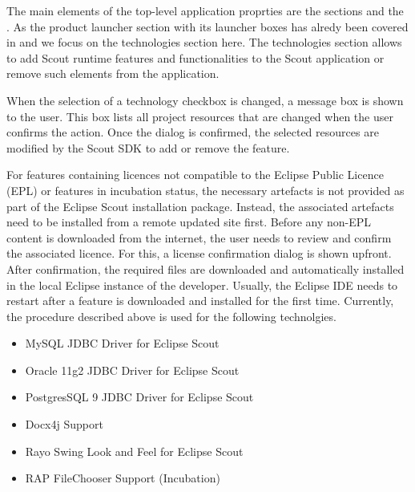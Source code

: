 \documentclass[a4paper,10pt,twoside]{book}
\begin{document}
The main elements of the top-level application proprties are the sections  and the . 
As the product launcher section with its launcher boxes has alredy been covered in  and  we focus on the technologies section here.
The technologies section allows to add Scout runtime features and functionalities to the Scout application or remove such elements from the application. 

When the selection of a technology checkbox is changed, a message box is shown to the user. 
This box lists all project resources that are changed when the user confirms the action. 
Once the dialog is confirmed, the selected resources are modified by the Scout SDK to add or remove the feature. 

For features containing licences not compatible to the Eclipse Public Licence (EPL) or features in incubation status, the necessary artefacts is not provided as part of the Eclipse Scout installation package. 
Instead, the associated artefacts need to be installed from a remote updated site first. 
Before any non-EPL content is downloaded from the internet, the user needs to review and confirm the associated licence. 
For this, a license confirmation dialog is shown upfront. 
After confirmation, the required files are downloaded and automatically installed in the local Eclipse instance of the developer. 
Usually, the Eclipse IDE needs to restart after a feature is downloaded and installed for the first time. 
Currently, the procedure described above is used for the following technolgies. 

\begin{itemize}
  \item MySQL JDBC Driver for Eclipse Scout
  \item Oracle 11g2 JDBC Driver for Eclipse Scout
  \item PostgresSQL 9 JDBC Driver for Eclipse Scout
  \item Docx4j Support
  \item Rayo Swing Look and Feel for Eclipse Scout
  \item RAP FileChooser Support (Incubation)
\end{itemize}
\end{document}
